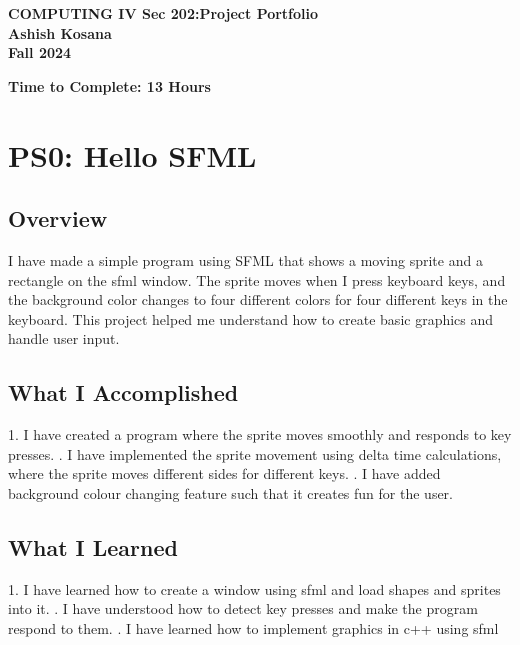 \documentclass[12pt]{article}
\begin{document}
\begin{center}
\thispagestyle{empty}
\noindent
\textbf{\Large COMPUTING IV Sec 202:Project Portfolio} \\[1em]
\textbf{\Large Ashish Kosana} \\[1em]
\textbf{\Large Fall 2024}

\vspace{1cm}  %
\end{center}

    \tableofcontents
    
    \vspace{1cm}  %
    \textbf{\Large Time to Complete: 13 Hours}


\clearpage
\pagestyle{fancy}
\fancyhf{}
\fancyhead[R]{\thepage}

\clearpage
\pagestyle{fancy}
\fancyhf{}
\fancyhead[R]{\thepage}

\section{PS0: Hello SFML}
\subsection{Overview}
I have made a simple program using SFML that shows a moving sprite  and a rectangle on the sfml window. The sprite moves when I press keyboard keys, and the background color changes to four different colors for four different keys in the keyboard. This project helped me understand how to create basic graphics and handle user input.

\subsection{What I Accomplished}
1. I have created a program where the sprite moves smoothly and responds to key presses.
. I have implemented the sprite movement using delta time calculations, where the sprite moves different sides for different keys.
. I have added  background colour changing feature such that it creates fun for the user.

\subsection{What I Learned}
1. I have learned how to create a window using sfml and load shapes and sprites into it.
.  I have understood how to detect key presses and make the program respond to them.
.  I have learned how to implement graphics in c++ using sfml
\end{document}
